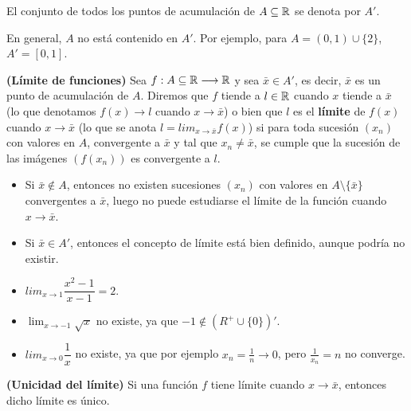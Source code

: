 El conjunto de todos los puntos de acumulación de $A\subseteq \mathbb{R}$ se denota por $A'$. 


\begin{observacion}
	En general, $A$ no está contenido en $A'$. Por ejemplo, para $ A = (0, 1) \cup \{2\}$, $A' = [0,1]$. 
\end{observacion}

\begin{definicion}
	\textbf{(Límite de funciones)}
	Sea $f : A \subseteq \mathbb{R} \longrightarrow \mathbb{R}$ y sea $\bar{x} \in A'$, es decir, $\bar{x}$ es un punto de acumulación de $A$. Diremos que $f$ tiende a $l\in \mathbb{R}$ cuando $x$ tiende a $\bar{x}$ (lo que denotamos $f(x)\rightarrow l$ cuando $x\rightarrow \bar{x}$) o bien que $l$ es el \textbf{límite} de $f(x)$ cuando $x\rightarrow \bar{x}$ (lo que se anota $l = lim_{x\rightarrow\bar{x}} f(x)$) si para toda sucesión $(x_n)$ con valores en $A$, convergente a $\bar{x}$ y tal que $x_n \neq \bar{x}$, se cumple que la sucesión de las imágenes $(f(x_n))$ es convergente a $l$. 
\end{definicion}

\begin{observacion}
	\begin{itemize}
		\item Si $\bar{x}\notin A$, entonces no existen sucesiones $(x_n)$ con valores en $A \setminus\{\bar{x}\}$ convergentes a $\bar{x}$, luego no puede estudiarse el límite de la función cuando $x \rightarrow \bar{x}$.  
		\item Si $\bar{x}\in A'$, entonces el concepto de límite está bien definido, aunque podría no existir. 
	\end{itemize}
\end{observacion}


\begin{ejemplo}
	\begin{itemize}
		\item $lim _{x\rightarrow 1} \dfrac{x^2 - 1}{x-1} = 2$. 
		\item $\lim_{x\rightarrow -1} \sqrt{x}$ no existe, ya que $-1 \notin (R^+ \cup \{0\})'$. 
		\item $lim_{x\rightarrow 0} \dfrac{1}{x}$ no existe, ya que por ejemplo $x_n = \frac{1}{n} \rightarrow 0$, pero $\frac{1}{x_n} = n$ no converge. 
	\end{itemize}
\end{ejemplo}


\begin{teorema}
	\textbf{(Unicidad del límite)}
	Si una función $f$ tiene límite cuando $x\rightarrow \bar{x}$, entonces dicho límite es único. 
\end{teorema}


